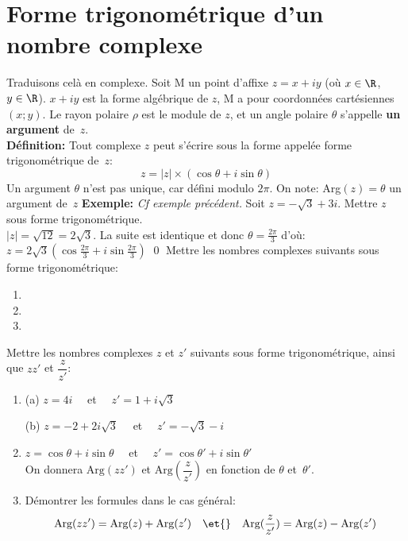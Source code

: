\documentclass[a4paper]{article}
\begin{document}
\section{Forme trigonom\'etrique d'un nombre complexe}
Traduisons cel\`a en complexe. Soit M un point d'affixe $z=x+iy$ (o\`u
$x\in\R$, $y\in\R$). $x+iy$ est la forme alg\'ebrique de $z$, M a pour
coordonn\'ees cart\'esiennes $(x;y)$. Le rayon polaire $\rho$ est le module de
$z$, et un angle polaire $\theta$ s'appelle  {\bf un argument}
de~$z$.\\
\noindent
{\bf D\'efinition:} Tout complexe $z$ peut s'\'ecrire sous la forme appel\'ee forme trigonom\'etrique de~$z$:
\[z=|z|\times(\cos \theta +i\sin\theta)  \]
Un argument $\theta$ n'est pas unique, car d\'efini modulo $2\pi$. On
note: Arg$(z)=\theta$ un argument de~$z$
\hline
\noindent
{\bf Exemple:} {\sl Cf exemple pr\'ec\'edent.} Soit
$z=-\sqrt3+3i$. Mettre $z$ sous forme trigonom\'etrique.\\
$|z|=\sqrt{12}=2\sqrt3$. La suite est identique et donc
$\theta=\frac{2\pi}{3}$ d'o\`u: $z=2\sqrt3(\cos\frac{2\pi}{3}  +i\sin\frac{2\pi}{3})$
\qed
\exercice
Mettre les nombres complexes suivants sous forme trigonom\'etrique:
\begin{enumerate}
\item {}
\item {}
\item {}
\end{enumerate}
\exercice
Mettre les nombres complexes $z$ et $z'$ suivants sous forme
trigonom\'etrique, ainsi que $zz'$ et $\dfrac{z}{z'}$:
\begin{enumerate}
\item %
\begin{minipage}[l]{0.45\textwidth}
(a) $z=4i\quad$ et $\quad z'=1+i\sqrt3$
\end{minipage}\hfill
\begin{minipage}[l]{0.45\textwidth}
(b) $z=-2+2i\sqrt3\quad$ et $\quad z'=-\sqrt3-i$
\end{minipage}%
\item $z=\cos\theta+i\sin\theta\quad$ et $\quad
  z'=\cos\theta'+i\sin\theta'$ \\
On donnera $\text{Arg}(zz')$ et
  $\text{Arg}(\dfrac{z}{z'})$ en fonction de $\theta$ et~$\theta'$.
\item D\'emontrer les formules dans le cas g\'en\'eral:
\[ \text{Arg}(zz')=\text{Arg}(z)+\text{Arg}(z')\quad\et{}\quad \text{Arg}(\dfrac{z}{z'})=\text{Arg}(z)-\text{Arg}(z')\]
\end{enumerate}
\end{document}
